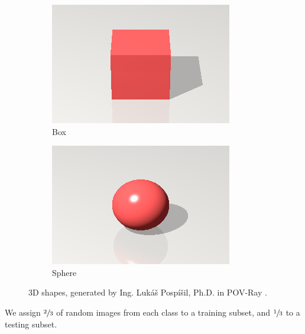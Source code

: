 \begin{figure}[ht]
    \centering
    \begin{subfigure}[t]{0.2\textwidth}
        \includegraphics[width=\textwidth]{Figures/datasets/box.png}
        \caption{Box}
    \end{subfigure}
    \begin{subfigure}[t]{0.2\textwidth}
        \includegraphics[width=\textwidth]{Figures/datasets/sphere.png}
        \caption{Sphere}
    \end{subfigure}
    \caption[3D shapes, generated by Ing. Lukáš Pospíšil, Ph.D. in POV-Ray]{3D shapes, generated by Ing. Lukáš Pospíšil, Ph.D. in POV-Ray \cite{povray}.}
    \label{fig:3d_shapes}
\end{figure}

We assign $\sfrac{2}{3}$ of random images from each class to a training subset, and $\sfrac{1}{3}$ to a testing subset.

